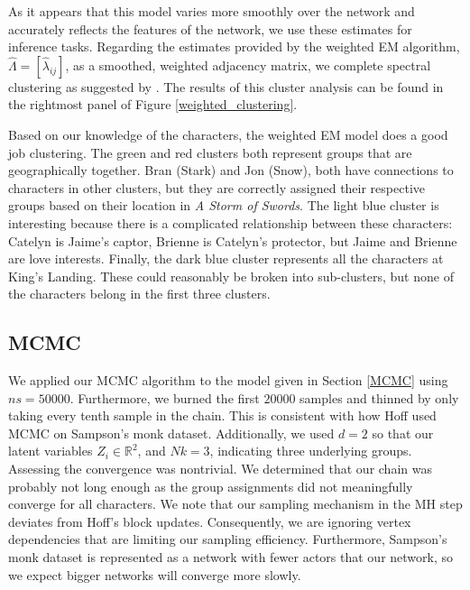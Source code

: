 \documentclass{article}
\begin{document}
As it appears that this model varies more smoothly over the network and accurately reflects the features of the network, we use these estimates for inference tasks. Regarding the estimates provided by the weighted EM algorithm, $\widehat{\Lambda} = [\hat{\lambda}_{ij}]$, as a smoothed, weighted adjacency matrix, we complete spectral clustering as suggested by \cite{Ng:2001:SCA:2980539.2980649}. The results of this cluster analysis can be found in the rightmost panel of Figure \ref{weighted_clustering}. 

Based on our knowledge of the characters, the weighted EM model does a good job clustering. The green and red clusters both represent groups that are geographically together. Bran (Stark) and Jon (Snow), both have connections to characters in other clusters, but they are correctly assigned their respective groups based on their location in \textit{A Storm of Swords}. The light blue cluster is interesting because there is a complicated relationship between these characters: Catelyn is Jaime's captor, Brienne is Catelyn's protector, but Jaime and Brienne are love interests. Finally, the dark blue cluster represents all the characters at King's Landing. These could reasonably be broken into sub-clusters, but none of the characters belong in the first three clusters.
 

\subsection{MCMC}

We applied our MCMC algorithm to the model given in Section \ref{MCMC} using $ns = 50000$. Furthermore, we burned the first $20000$ samples and thinned by only taking every tenth sample in the chain. This is consistent with how Hoff used MCMC on Sampson's monk dataset. Additionally, we used $d = 2$ so that our latent variables $Z_i \in \mathbb{R}^2$, and $Nk = 3$, indicating three underlying groups. Assessing the convergence was nontrivial. We determined that our chain was probably not long enough as the group assignments did not meaningfully converge for all characters. We note that our sampling mechanism in the MH step deviates from Hoff's block updates. Consequently, we are ignoring vertex dependencies that are limiting our sampling efficiency. Furthermore, Sampson's monk dataset is represented as a network with fewer actors that our network, so we expect bigger networks will converge more slowly.
\end{document}
